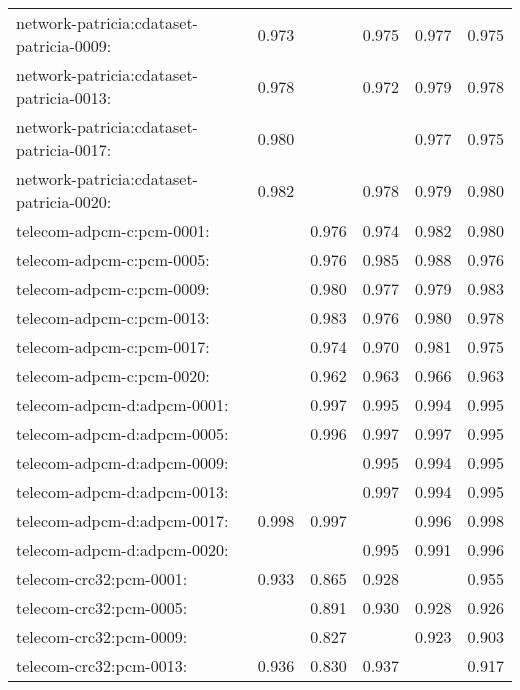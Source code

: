 \begin{longtable}{lrrrrr}
network-patricia:cdataset-patricia-0009: & 0.973 & \color{Green}{0.985} & 0.975 & 0.977 & 0.975 \\
network-patricia:cdataset-patricia-0013: & 0.978 & \color{Green}{0.981} & 0.972 & 0.979 & 0.978 \\
network-patricia:cdataset-patricia-0017: & 0.980 & \color{Green}{0.984} & \color{Green}{0.984} & 0.977 & 0.975 \\
network-patricia:cdataset-patricia-0020: & 0.982 & \color{Green}{0.989} & 0.978 & 0.979 & 0.980 \\
telecom-adpcm-c:pcm-0001: & \color{Green}{0.996} & 0.976 & 0.974 & 0.982 & 0.980 \\
telecom-adpcm-c:pcm-0005: & \color{Green}{0.990} & 0.976 & 0.985 & 0.988 & 0.976 \\
telecom-adpcm-c:pcm-0009: & \color{Green}{0.997} & 0.980 & 0.977 & 0.979 & 0.983 \\
telecom-adpcm-c:pcm-0013: & \color{Green}{0.997} & 0.983 & 0.976 & 0.980 & 0.978 \\
telecom-adpcm-c:pcm-0017: & \color{Green}{0.997} & 0.974 & 0.970 & 0.981 & 0.975 \\
telecom-adpcm-c:pcm-0020: & \color{Green}{0.987} & 0.962 & 0.963 & 0.966 & 0.963 \\
telecom-adpcm-d:adpcm-0001: & \color{Green}{0.998} & 0.997 & 0.995 & 0.994 & 0.995 \\
telecom-adpcm-d:adpcm-0005: & \color{Green}{0.998} & 0.996 & 0.997 & 0.997 & 0.995 \\
telecom-adpcm-d:adpcm-0009: & \color{Green}{0.998} & \color{Green}{0.998} & 0.995 & 0.994 & 0.995 \\
telecom-adpcm-d:adpcm-0013: & \color{Green}{0.998} & \color{Green}{0.998} & 0.997 & 0.994 & 0.995 \\
telecom-adpcm-d:adpcm-0017: & 0.998 & 0.997 & \color{Green}{0.999} & 0.996 & 0.998 \\
telecom-adpcm-d:adpcm-0020: & \color{Green}{0.997} & \color{Green}{0.997} & 0.995 & 0.991 & 0.996 \\
telecom-crc32:pcm-0001: & 0.933 & 0.865 & 0.928 & \color{Green}{0.959} & 0.955 \\
telecom-crc32:pcm-0005: & \color{Green}{0.934} & 0.891 & 0.930 & 0.928 & 0.926 \\
telecom-crc32:pcm-0009: & \color{Green}{0.933} & 0.827 & \color{Green}{0.933} & 0.923 & 0.903 \\
telecom-crc32:pcm-0013: & 0.936 & 0.830 & 0.937 & \color{Green}{0.938} & 0.917 \\

\end{longtable}
